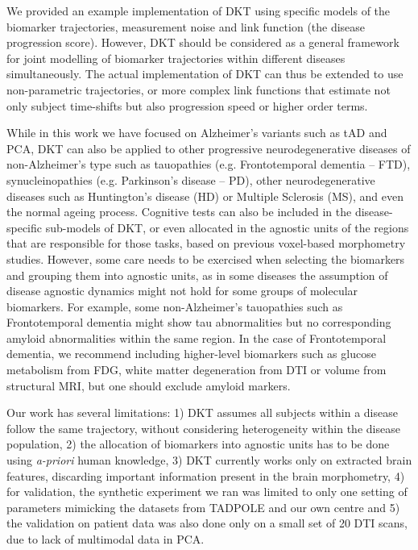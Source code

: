 \documentclass{llncs}
\begin{document}
We provided an example implementation of DKT using specific models of the biomarker trajectories, measurement noise and link function (the disease progression score). However, DKT should be considered as a general framework for joint modelling of biomarker trajectories within different diseases simultaneously. The actual implementation of DKT can thus be extended to use non-parametric trajectories, or more complex link functions that estimate not only subject time-shifts but also progression speed or higher order terms.

While in this work we have focused on Alzheimer's variants such as tAD and PCA, DKT can also be applied to other progressive neurodegenerative diseases of non-Alzheimer's type such as tauopathies (e.g. Frontotemporal dementia -- FTD), synucleinopathies (e.g. Parkinson's disease -- PD), other neurodegenerative diseases such as Huntington's disease (HD) or Multiple Sclerosis (MS), and even the normal ageing process. Cognitive tests can also be included in the disease-specific sub-models of DKT, or even allocated in the agnostic units of the regions that are responsible for those tasks, based on previous voxel-based morphometry studies. However, some care needs to be exercised when selecting the biomarkers and grouping them into agnostic units, as in some diseases the assumption of disease agnostic dynamics might not hold for some groups of molecular biomarkers. For example, some non-Alzheimer's tauopathies such as Frontotemporal dementia might show tau abnormalities but no corresponding amyloid abnormalities within the same region. In the case of Frontotemporal dementia, we recommend including higher-level biomarkers such as glucose metabolism from FDG, white matter degeneration from DTI or volume from structural MRI, but one should exclude amyloid markers. 

Our work has several limitations: 1) DKT assumes all subjects within a disease follow the same trajectory, without considering heterogeneity within the disease population, 2) the allocation of biomarkers into agnostic units has to be done using \emph{a-priori} human knowledge, 3) DKT currently works only on extracted brain features, discarding important information present in the brain morphometry, 4) for validation, the synthetic experiment we ran was limited to only one setting of parameters mimicking the datasets from TADPOLE and our own centre and 5) the validation on patient data was also done only on a small set of 20 DTI scans, due to lack of multimodal data in PCA.
\end{document}
